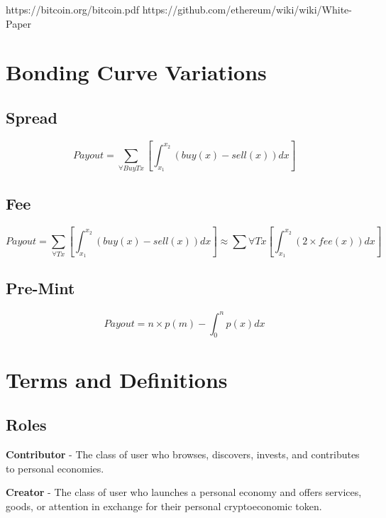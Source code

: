 \documentclass[a4paper]{article}
\begin{document}
\begin{thebibliography}{1}

 https://bitcoin.org/bitcoin.pdf
 https://github.com/ethereum/wiki/wiki/White-Paper

\end{thebibliography}

\begin{appendices}

\section{Bonding Curve Variations}

\subsection{Spread}

\[Payout = \sum_{\forall BuyTx} \left [ \int_{x_{1}}^{x_{2}}(buy(x)-sell(x))dx \right ]\]

\subsection{Fee}

\[Payout = \sum_{\forall Tx} \left [ \int_{x_{1}}^{x_{2}}(buy(x)-sell(x))dx \right ] \approx \sum{\forall Tx} \left [ \int_{x_{1}}^{x_{2}}(2 \times fee(x))dx \right ]\]

\subsection{Pre-Mint}

\[Payout = n \times p(m) - \int_{0}^{n} p(x) dx\]

\section{Terms and Definitions}

\subsection{Roles}

\textbf{Contributor} - The class of user who browses, discovers, invests, and contributes to personal economies. 
\medskip

\noindent
\textbf{Creator} - The class of user who launches a personal economy and offers services, goods, or attention in exchange for their personal cryptoeconomic token.
\medskip


\end{appendices}
\end{document}
